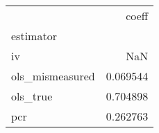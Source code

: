 \begin{tabular}{lr}
\toprule
{} &     coeff \\
estimator       &           \\
\midrule
iv              &       NaN \\
ols\_mismeasured &  0.069544 \\
ols\_true        &  0.704898 \\
pcr             &  0.262763 \\
\bottomrule
\end{tabular}
